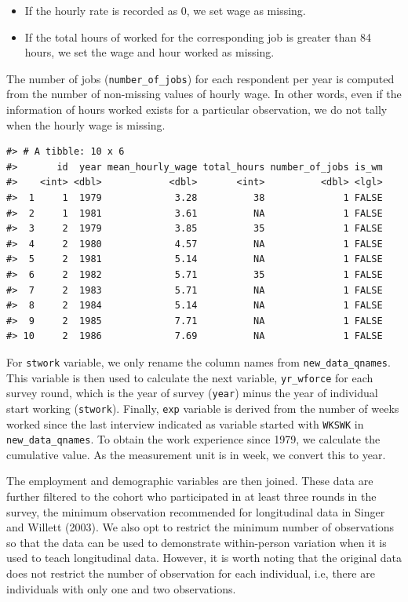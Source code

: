 \documentclass{article}
\providecommand{\tightlist}{%
  \setlength{\itemsep}{0pt}\setlength{\parskip}{0pt}}
\begin{document}
\begin{itemize}
\tightlist
\item
  If the hourly rate is recorded as 0, we set wage as missing.
\item
  If the total hours of worked for the corresponding job is greater than 84 hours, we set the wage and hour worked as missing.
\end{itemize}

The number of jobs (\texttt{number\_of\_jobs}) for each respondent per year is computed from the number of non-missing values of hourly wage. In other words, even if the information of hours worked exists for a particular observation, we do not tally when the hourly wage is missing.

\begin{verbatim}
#> # A tibble: 10 x 6
#>       id  year mean_hourly_wage total_hours number_of_jobs is_wm
#>    <int> <dbl>            <dbl>       <int>          <dbl> <lgl>
#>  1     1  1979             3.28          38              1 FALSE
#>  2     1  1981             3.61          NA              1 FALSE
#>  3     2  1979             3.85          35              1 FALSE
#>  4     2  1980             4.57          NA              1 FALSE
#>  5     2  1981             5.14          NA              1 FALSE
#>  6     2  1982             5.71          35              1 FALSE
#>  7     2  1983             5.71          NA              1 FALSE
#>  8     2  1984             5.14          NA              1 FALSE
#>  9     2  1985             7.71          NA              1 FALSE
#> 10     2  1986             7.69          NA              1 FALSE
\end{verbatim}

For \texttt{stwork} variable, we only rename the column names from \texttt{new\_data\_qnames}. This variable is then used to calculate the next variable, \texttt{yr\_wforce} for each survey round, which is the year of survey (\texttt{year}) minus the year of individual start working (\texttt{stwork}). Finally, \texttt{exp} variable is derived from the number of weeks worked since the last interview indicated as variable started with \texttt{WKSWK} in \texttt{new\_data\_qnames}. To obtain the work experience since 1979, we calculate the cumulative value. As the measurement unit is in week, we convert this to year.

The employment and demographic variables are then joined. These data are further filtered to the cohort who participated in at least three rounds in the survey, the minimum observation recommended for longitudinal data in Singer and Willett (2003). We also opt to restrict the minimum number of observations so that the data can be used to demonstrate within-person variation when it is used to teach longitudinal data. However, it is worth noting that the original data does not restrict the number of observation for each individual, i.e, there are individuals with only one and two observations.
\end{document}
